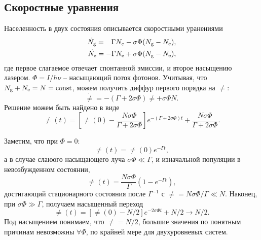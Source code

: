 \subsection{Скоростные уравнения}


 Населенность в двух состояния описывается скоростными уранениями
\begin{align*}
    \dot{N_{\textnormal{g}}} = \phantom{-}\Gamma N_e - \sigma \Phi (N_{\textnormal{g}} - N_{\textnormal{e}}), \\
    \dot{N_{\textnormal{e}}} = - \Gamma N_{\textnormal{e}} + \sigma \Phi (N_{\textnormal{g}} - N_{\textnormal{e}}),
\end{align*}
где первое слагаемое отвечает спонтанной эмиссии, и второе насыщению лазером. $\Phi = I / h \nu$ -- насыщающий поток фотонов. Учитывая, что $N_{\textnormal{g}} + N_{\textnormal{e}} = N = \textnormal{const} $, можем получить диффур первого порядка на $\ne$:
\begin{equation*}
    \dot{\ne} = - (\Gamma + 2 \sigma \Phi) \ne + \sigma \Phi N.
\end{equation*}
Решение можем быть найдено в виде
\begin{equation*}
    \ne (t) = \left[
         \ne(0) - \frac{N \sigma \Phi}{\Gamma + 2 \sigma \Phi} 
    \right] e^{-(\Gamma + 2 \sigma \Phi) t} + \frac{N \sigma \Phi}{\Gamma + 2 \sigma \Phi}.
\end{equation*}

Заметим, что при $\Phi = 0$:
\begin{equation*}
    \ne (t) = \ne (0) e^{- \Gamma t},
\end{equation*}
а в случае слаюого насыщающего луча $\sigma \Phi \ll \Gamma$, и изначальной популяции в невозбужденном состоянии,
\begin{equation*}
    \ne (t) = \frac{N \sigma \Phi}{\Gamma} \left(1 - e^{- \Gamma t}\right),
\end{equation*}
достигающий стационарного состояния после $\Gamma^{-1}$ с $\ne = N \sigma \Phi / \Gamma \ll N$.   Наконец, при $\sigma \Phi \gg \Gamma$, получаем насыщенный переход
\begin{equation*}
    \ne (t) = \left[\ne(0) - N/2\right]e^{-2 \sigma \Phi t} + N / 2 \to N/2.
\end{equation*}
Под насыщением понимаем, что $\ne = N/2$, большие значения по понятным причинам невозможны $\forall  \Phi$, по крайней мере для двухуровневых систем. 

